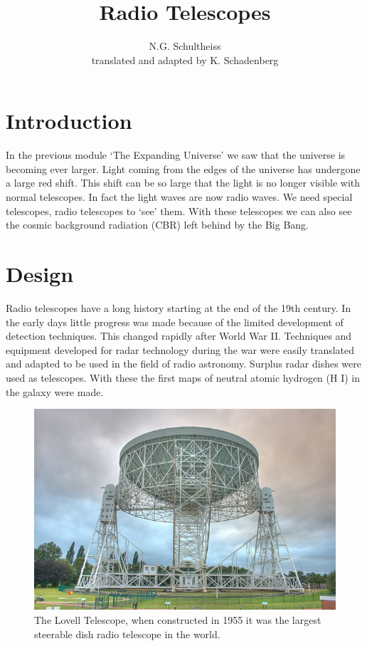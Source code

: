 \documentclass[12pt,a4paper]{article}
\author{N.G. Schultheiss \\ translated and adapted by K. Schadenberg}
\date{}
\title{Radio Telescopes}
\numberwithin{equation}{section}
\numberwithin{figure}{section}
\numberwithin{table}{section}
\begin{document}
\maketitle

\section{Introduction}
In the previous module `The Expanding Universe' we saw that the universe is becoming ever larger. Light coming from the edges of the universe has undergone a large red shift. This shift can be so large that the light is no longer visible with normal telescopes. In fact the light waves are now radio waves. We need special telescopes, radio telescopes to `see' them. With these telescopes we can also see the cosmic background radiation (CBR) left behind by the Big Bang. 

\section{Design}
Radio telescopes have a long history starting at the end of the 19th century. In the early days little progress was made because of the limited development of detection techniques. This changed rapidly after World War II. Techniques and equipment developed for radar technology during the war were easily translated and adapted to be used in the field of radio astronomy. Surplus radar dishes were used as telescopes. With these the first maps of neutral atomic hydrogen (H I) in the galaxy were made.

\begin{figure}\begin{center}
\includegraphics[scale=0.5]{Lovell_Telescope.jpg}%
\caption{The Lovell Telescope, when constructed in 1955 it was the largest steerable dish radio telescope in the world.}
\end{center}\end{figure}
\end{document}
